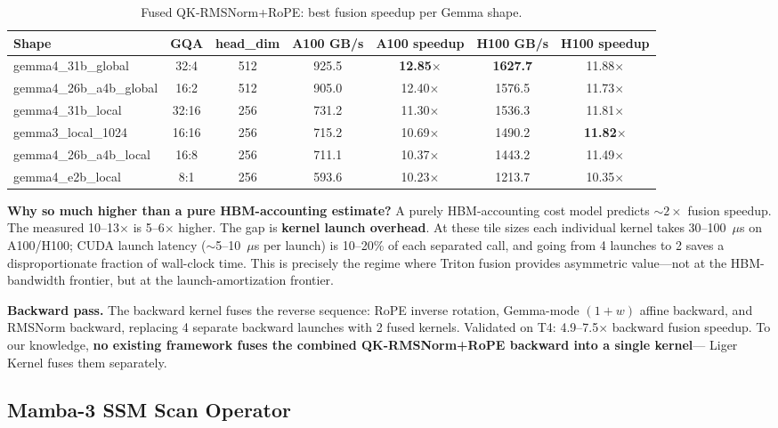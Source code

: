 \documentclass[11pt]{article}
\begin{document}
\begin{table}[t]
\centering
\caption{Fused QK-RMSNorm+RoPE: best fusion speedup per Gemma shape.}
\label{tab:fusion-speedup}
\small
\begin{tabular}{@{}lcccccc@{}}
\toprule
Shape & GQA & head\_dim & A100 GB/s & A100 speedup & H100 GB/s & H100 speedup \\
\midrule
gemma4\_31b\_global & 32:4 & 512 & 925.5 & \textbf{12.85$\times$} & \textbf{1627.7} & 11.88$\times$ \\
gemma4\_26b\_a4b\_global & 16:2 & 512 & 905.0 & 12.40$\times$ & 1576.5 & 11.73$\times$ \\
gemma4\_31b\_local & 32:16 & 256 & 731.2 & 11.30$\times$ & 1536.3 & 11.81$\times$ \\
gemma3\_local\_1024 & 16:16 & 256 & 715.2 & 10.69$\times$ & 1490.2 & \textbf{11.82$\times$} \\
gemma4\_26b\_a4b\_local & 16:8 & 256 & 711.1 & 10.37$\times$ & 1443.2 & 11.49$\times$ \\
gemma4\_e2b\_local & 8:1 & 256 & 593.6 & 10.23$\times$ & 1213.7 & 10.35$\times$ \\
\bottomrule
\end{tabular}
\end{table}

\textbf{Why so much higher than a pure HBM-accounting estimate?} A purely
HBM-accounting cost model predicts ${\sim}2\times$ fusion speedup. The measured
10--13$\times$ is 5--6$\times$ higher. The gap is \textbf{kernel launch overhead}.
At these tile sizes each individual kernel takes 30--100~$\mu$s on A100/H100;
CUDA launch latency (${\sim}$5--10~$\mu$s per launch) is 10--20\% of each
separated call, and going from 4 launches to 2 saves a disproportionate fraction
of wall-clock time. This is precisely the regime where Triton fusion provides
asymmetric value---not at the HBM-bandwidth frontier, but at the
launch-amortization frontier.

\textbf{Backward pass.} The backward kernel fuses the reverse sequence: RoPE
inverse rotation, Gemma-mode $(1+w)$ affine backward, and RMSNorm backward,
replacing 4 separate backward launches with 2 fused kernels. Validated on T4:
4.9--7.5$\times$ backward fusion speedup. To our knowledge, \textbf{no existing
framework fuses the combined QK-RMSNorm+RoPE backward into a single kernel}---
Liger Kernel fuses them separately.


\subsection{Mamba-3 SSM Scan Operator}
\label{sec:ssm-scan}
\end{document}
